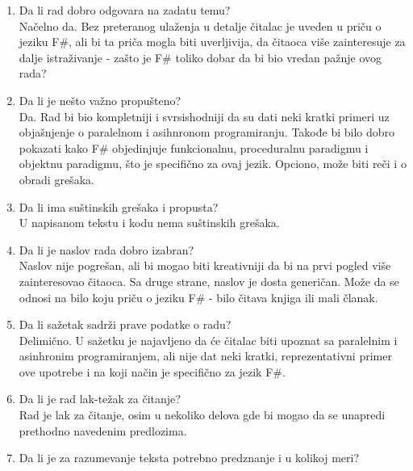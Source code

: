 \documentclass[a4paper]{report}
\begin{document}
\begin{enumerate}
\item Da li rad dobro odgovara na zadatu temu?\\

Načelno da. Bez preteranog ulaženja u detalje čitalac je uveden u priču o jeziku F\#,
ali bi ta priča mogla biti uverljivija, da čitaoca više zainteresuje za dalje istraživanje
- zašto je F\# toliko dobar da bi bio vredan
pažnje ovog rada?

\item Da li je nešto važno propušteno?\\

Da. Rad bi bio kompletniji i svrsishodniji da su dati neki kratki primeri
uz objašnjenje o paralelnom i asihnronom programiranju. 
Takođe bi bilo dobro pokazati kako F\# objedinjuje funkcionalnu, 
proceduralnu paradigmu i objektnu paradigmu, što je specifično za ovaj jezik. 
Opciono, može biti reči i o obradi grešaka.

\item Da li ima suštinskih grešaka i propusta?\\

U napisanom tekstu i kodu nema suštinskih grešaka.

\item Da li je naslov rada dobro izabran?\\

Naslov nije pogrešan, ali bi mogao biti kreativniji da bi na prvi pogled više
zainteresovao čitaoca. Sa druge strane, naslov je dosta generičan. 
Može da se odnosi na bilo koju priču o jeziku F\# - bilo čitava knjiga ili mali članak.

\item Da li sažetak sadrži prave podatke o radu?\\

Delimično. U sažetku je najavljeno da će čitalac biti upoznat sa paralelnim
i asinhronim programiranjem, ali nije dat neki kratki, reprezentativni primer
ove upotrebe i na koji način je specifično za jezik F\#.

\item Da li je rad lak-težak za čitanje?\\

Rad je lak za čitanje, osim u nekoliko delova gde bi mogao da se unapredi prethodno
navedenim predlozima.

\item Da li je za razumevanje teksta potrebno predznanje i u kolikoj meri?\\


\end{enumerate}
\end{document}
